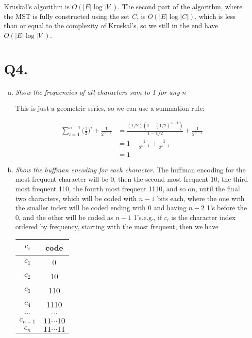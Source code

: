 \documentclass{article}
\begin{document}
Kruskal's algorithm is $O(|E|\log|V|)$. The second part of the algorithm, where the MST is fully constructed using the set $C$, is $O(|E|\log|C|)$, which is less than or equal to the complexity of Kruskal's, so we still in the end have $O(|E|\log|V|)$.











\section*{Q4. }

\begin{enumerate}[(a)]
  \item \textit{Show the frequencies of all characters sum to 1 for any $n$}

    This is just a geometric series, so we can use a summation rule:

    \begin{align*}
      \sum_{i=1}^{n-1} \Big(\frac{1}{2}\Big)^i + \frac{1}{2^{n-1}} &= \frac{(1/2)(1-(1/2)^{n-1})}{1-1/2} + \frac{1}{2^{n-1}}\\
      &= 1 - \frac{1}{2^{n-1}} + \frac{1}{2^{n-1}} \\
      &= 1
    \end{align*}

  \item \textit{Show the huffman encoding for each character.}
    The huffman encoding for the most frequent character will be 0, then the second most frequent 10, the third most frequent 110, the fourth most frequent 1110, and so on, until the final two characters, which will be coded with $n-1$ bits each, where the one with the smaller index will be coded ending with 0 and having $n-2$ 1's before the 0, and the other will be coded as $n-1$ 1's.e.g., if $c_i$ is the character index ordered by frequency, starting with the most frequent, then we have

\begin{table}[h!]
  \centering
  \begin{tabular} {c | c }
    $c_i$ & code \\ 
    \hline  
    $c_1$ & 0 \\
    $c_2$ & 10 \\
    $c_3$ & 110 \\
    $c_4$ & 1110 \\
    $\cdots$ & $\cdots$ \\
    $c_{n-1}$ & $11\cdots10$\\
    $c_n$ & $11\cdots11$\\
  \end{tabular}
\end{table}


\end{enumerate}
\end{document}
